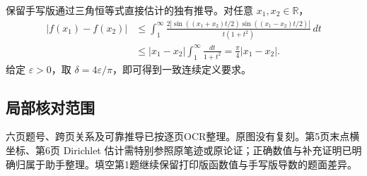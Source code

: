\documentclass[11pt,fontset=fandol]{ctexart}
\begin{document}
保留手写版通过三角恒等式直接估计的独有推导。对任意
\(x_1,x_2\in\mathbb R\)， \[
\begin{aligned}
|f(x_1)-f(x_2)|
&\le\int_1^\infty
\frac{2|\sin((x_1+x_2)t/2)\sin((x_1-x_2)t/2)|}{t(1+t^2)}\,dt\\
&\le|x_1-x_2|\int_1^\infty\frac{dt}{1+t^2}
=\frac\pi4|x_1-x_2|.
\end{aligned}
\] 给定 \(\varepsilon>0\)，取
\(\delta=4\varepsilon/\pi\)，即可得到一致连续定义要求。

\subsection{局部核对范围}\label{ux5c40ux90e8ux6838ux5bf9ux8303ux56f4}

六页题号、跨页关系及可靠推导已按逐页OCR整理。原图没有复刻。第5页末点横坐标、第6页
Dirichlet
估计需特别参照原笔迹或原论证；正确数值与补充证明已明确归属于助手整理。填空第1题继续保留打印版函数值与手写版导数的题面差异。
\end{document}
